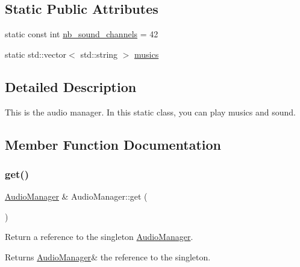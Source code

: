 \subsection*{Static Public Attributes}
\begin{DoxyCompactItemize}
\item 
static const int \hyperlink{class_audio_manager_abd1cfb41f75592fc90007aad609a11ee}{nb\+\_\+sound\+\_\+channels} = 42
\item 
static std\+::vector$<$ std\+::string $>$ \hyperlink{class_audio_manager_ab4f16f2b8df28e812c60769c534644b0}{musics}
\end{DoxyCompactItemize}


\subsection{Detailed Description}
This is the audio manager. In this static class, you can play musics and sound. 

\subsection{Member Function Documentation}
\mbox{\label{class_audio_manager_ac8e8acadc8bba682bd3835997d379f5c}} 
\subsubsection{\texorpdfstring{get()}{get()}}
{\footnotesize\ttfamily \hyperlink{class_audio_manager}{Audio\+Manager} \& Audio\+Manager\+::get (\begin{DoxyParamCaption}{ }\end{DoxyParamCaption})\hspace{0.3cm}{\ttfamily [static]}}



Return a reference to the singleton \hyperlink{class_audio_manager}{Audio\+Manager}. 

\begin{DoxyReturn}{Returns}
\hyperlink{class_audio_manager}{Audio\+Manager}\& the reference to the singleton. 
\end{DoxyReturn}
\mbox{\label{class_audio_manager_a68184311194e3f5609e34b8e806655b9}} 
